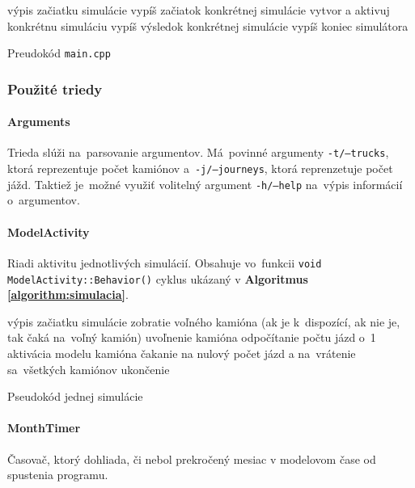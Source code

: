 \documentclass[a4paper, 11pt]{article}
\begin{document}
    \begin{algorithm}[ht]
		výpis začiatku simulácie\;
		{
			vypíš začiatok konkrétnej simulácie\;
            vytvor a aktivuj konkrétnu simuláciu\;
            vypíš výsledok konkrétnej simulácie\;
		}
        vypíš koniec simulátora\;
		\caption{Preudokód \texttt{main.cpp}}
		\label{algorithm:mainfile}
	\end{algorithm}

    \subsubsection{Použité triedy}
    \paragraph{Arguments}
    Trieda slúži na~parsovanie argumentov. Má~povinné argumenty \texttt{-t/--trucks},
    ktorá reprezentuje počet kamiónov a~\texttt{-j/--journeys}, ktorá reprenzetuje
    počet jážd. Taktiež je~možné využiť volitelný argument \texttt{-h/--help}
    na~výpis informácií o~argumentov.
    
    \paragraph{ModelActivity}
    Riadi aktivitu jednotlivých simulácií. Obsahuje vo~funkcii
    \texttt{void ModelActivity::Behavior()} cyklus ukázaný v \textbf{Algoritmus \ref{algorithm:simulacia}}.
    \begin{algorithm}[ht]

		výpis začiatku simulácie\;
		{
			zobratie voľného kamióna (ak je k~dispozící, ak nie je, tak čaká na~voľný kamión)\;
			{
				uvoľnenie kamióna\;
				\Break\;
			}
			{
				odpočítanie počtu jázd o~1\;
				aktivácia modelu kamióna\;
			}
		}
		čakanie na nulový počet jázd a na~vrátenie sa~všetkých kamiónov\;
		ukončenie\;

		\caption{Pseudokód jednej simulácie}
		\label{algorithm:simulacia}
	\end{algorithm}
    
    \paragraph{MonthTimer}
    Časovač, ktorý dohliada, či nebol prekročený mesiac v modelovom čase od spustenia programu.
\end{document}
